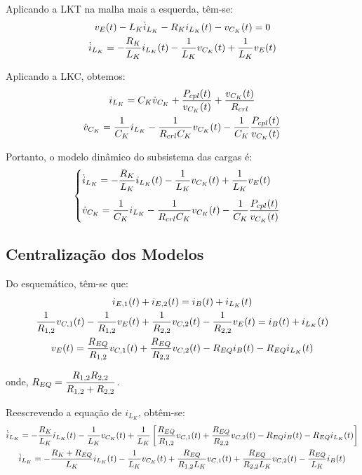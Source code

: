Aplicando a LKT na malha mais a esquerda, têm-se:
\begin{gather}
  v_E(t) - L_K \dot{i}_{L_K} - R_K i_{L_K}(t) - v_{C_K}(t) = 0 \nle
  \dot{i}_{L_K} = - \frac{R_K}{L_K} i_{L_K}(t) - \frac{1}{L_K} v_{C_K}(t) + \frac{1}{L_K} v_E(t)
\end{gather}

Aplicando a LKC, obtemos:
\begin{gather}
  i_{L_K} = C_K \dot{v}_{C_K} + \frac{P_{cpl}(t)}{v_{C_K}(t)} + \frac{v_{C_K}(t)}{R_{crl}} \nle
  \dot{v}_{C_K} = \frac{1}{C_K} i_{L_K} - \frac{1}{R_{crl} C_K} v_{C_K}(t) - \frac{1}{C_K} \frac{P_{cpl}(t)}{v_{C_K}(t)}
\end{gather}

Portanto, o modelo dinâmico do subsistema das cargas é:
\begin{gather}
  \begin{cases}
    \dot{i}_{L_K} = \displaystyle - \frac{R_K}{L_K} i_{L_K}(t) - \frac{1}{L_K} v_{C_K}(t) + \frac{1}{L_K} v_E(t) \\[12pt]
    \dot{v}_{C_K} = \displaystyle \frac{1}{C_K} i_{L_K} - \frac{1}{R_{crl} C_K} v_{C_K}(t) - \frac{1}{C_K} \frac{P_{cpl}(t)}{v_{C_K}(t)}
  \end{cases}
\end{gather}

\subsection*{Centralização dos Modelos}

Do esquemático, têm-se que:
\begin{gather}
  i_{E,1}(t) + i_{E,2}(t) = i_B(t) + i_{L_K}(t) \nle
  \frac{1}{R_{1,2}} v_{C,1}(t) - \frac{1}{R_{1,2}} v_E(t) + \frac{1}{R_{2,2}} v_{C,2}(t) - \frac{1}{R_{2,2}} v_E(t) =
  i_B(t) + i_{L_K}(t) \nle
  v_E(t) = \frac{R_{EQ}}{R_{1,2}} v_{C,1}(t) + \frac{R_{EQ}}{R_{2,2}} v_{C,2}(t) - R_{EQ} i_B(t) - R_{EQ} i_{L_K}(t)
\end{gather}

onde, $R_{EQ} = \displaystyle \frac{R_{1,2}R_{2,2}}{R_{1,2} + R_{2,2}}$.

\vspace*{8pt}

Reescrevendo a equação de $i_{L_K}$, obtêm-se:
\begin{gather}
  \dot{i}_{L_K} =  - \frac{R_K}{L_K} i_{L_K}(t) - \frac{1}{L_K} v_{C_K}(t) + \frac{1}{L_K} \left[\frac{R_{EQ}}{R_{1,2}} v_{C,1}(t) + \frac{R_{EQ}}{R_{2,2}} v_{C,2}(t) - R_{EQ} i_B(t) - R_{EQ} i_{L_K}(t)\right] \nle
  \dot{i}_{L_K} =  - \frac{R_K + R_{EQ}}{L_K} i_{L_K}(t) - \frac{1}{L_K} v_{C_K}(t) + \frac{R_{EQ}}{R_{1,2} L_K} v_{C,1}(t) + \frac{R_{EQ}}{R_{2,2} L_K} v_{C,2}(t) - \frac{R_{EQ}}{L_K} i_B(t)
\end{gather}

